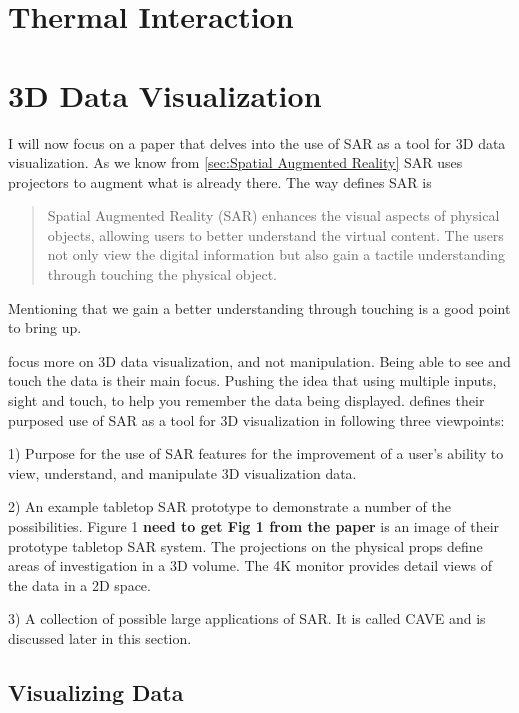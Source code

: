 \documentclass{sig-alternate}
\begin{document}
\section{Thermal Interaction}
\label{sec:Thermal Interaction}

\section{3D Data Visualization}
\label{sec:3D Data Visualization}

I will now focus on a paper that delves into the use of SAR as a tool for 3D data visualization. As we know from \ref{sec:Spatial Augmented Reality} SAR uses projectors to augment what is already there. The way \cite{3D} defines SAR is 
\begin{quote}
Spatial Augmented Reality (SAR) enhances the visual aspects of physical objects, allowing users to better understand the virtual content. The users not only view the digital information but also gain a tactile understanding through touching the physical object.
\end{quote}

Mentioning that we gain a better understanding through touching is a good point to bring up. 

\cite{3D} focus more on 3D data visualization, and not manipulation. Being able to see and touch the data is their main focus. Pushing the idea that using multiple inputs, sight and touch, to help you remember the data being displayed. \cite{3D} defines their purposed use of SAR as a tool for 3D visualization in following three viewpoints: 

1) Purpose for the use of SAR features for the improvement of a user's ability to view, understand, and manipulate 3D visualization data. 

2) An example tabletop SAR prototype to demonstrate a number of the possibilities. Figure 1 \textbf{need to get Fig 1 from the paper} is an image of their prototype tabletop SAR system. The projections on the physical props define areas of investigation in a 3D volume. The 4K monitor provides detail views of the data in a 2D space. 

3) A collection of possible large applications of SAR. It is called CAVE and is discussed later in this section.


\subsection{Visualizing Data}
\label{sec:Visualizing Data}
\end{document}
